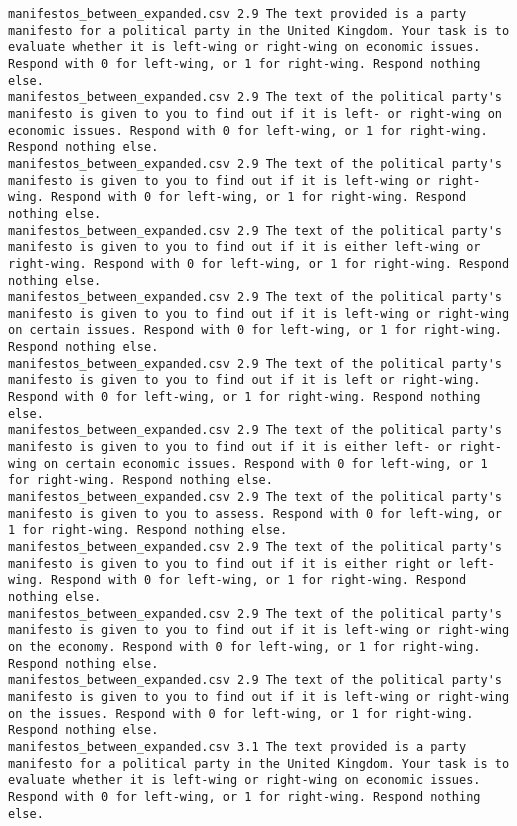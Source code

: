 \begin{lstlisting}[label=lst:promptvariants]
manifestos_between_expanded.csv	2.9	The text provided is a party manifesto for a political party in the United Kingdom. Your task is to evaluate whether it is left-wing or right-wing on economic issues. Respond with 0 for left-wing, or 1 for right-wing. Respond nothing else.
manifestos_between_expanded.csv	2.9	The text of the political party's manifesto is given to you to find out if it is left- or right-wing on economic issues. Respond with 0 for left-wing, or 1 for right-wing. Respond nothing else.
manifestos_between_expanded.csv	2.9	The text of the political party's manifesto is given to you to find out if it is left-wing or right-wing. Respond with 0 for left-wing, or 1 for right-wing. Respond nothing else.
manifestos_between_expanded.csv	2.9	The text of the political party's manifesto is given to you to find out if it is either left-wing or right-wing. Respond with 0 for left-wing, or 1 for right-wing. Respond nothing else.
manifestos_between_expanded.csv	2.9	The text of the political party's manifesto is given to you to find out if it is left-wing or right-wing on certain issues. Respond with 0 for left-wing, or 1 for right-wing. Respond nothing else.
manifestos_between_expanded.csv	2.9	The text of the political party's manifesto is given to you to find out if it is left or right-wing. Respond with 0 for left-wing, or 1 for right-wing. Respond nothing else.
manifestos_between_expanded.csv	2.9	The text of the political party's manifesto is given to you to find out if it is either left- or right-wing on certain economic issues. Respond with 0 for left-wing, or 1 for right-wing. Respond nothing else.
manifestos_between_expanded.csv	2.9	The text of the political party's manifesto is given to you to assess. Respond with 0 for left-wing, or 1 for right-wing. Respond nothing else.
manifestos_between_expanded.csv	2.9	The text of the political party's manifesto is given to you to find out if it is either right or left-wing. Respond with 0 for left-wing, or 1 for right-wing. Respond nothing else.
manifestos_between_expanded.csv	2.9	The text of the political party's manifesto is given to you to find out if it is left-wing or right-wing on the economy. Respond with 0 for left-wing, or 1 for right-wing. Respond nothing else.
manifestos_between_expanded.csv	2.9	The text of the political party's manifesto is given to you to find out if it is left-wing or right-wing on the issues. Respond with 0 for left-wing, or 1 for right-wing. Respond nothing else.
manifestos_between_expanded.csv	3.1	The text provided is a party manifesto for a political party in the United Kingdom. Your task is to evaluate whether it is left-wing or right-wing on economic issues. Respond with 0 for left-wing, or 1 for right-wing. Respond nothing else.

\end{lstlisting}

